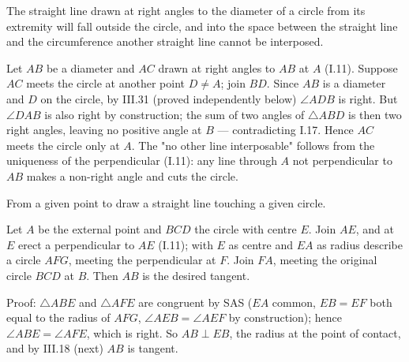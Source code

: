 \documentclass{rrxiv}
\begin{document}
\begin{claim}
\label{prop:III.16}
The straight line drawn at right angles to the diameter of a circle
from its extremity will fall outside the circle, and into the space
between the straight line and the circumference another straight
line cannot be interposed.
\end{claim}
\begin{evidence}
\label{ev:III.16}
Let $AB$ be a diameter and $AC$ drawn at right angles to $AB$ at
$A$ (I.11).  Suppose $AC$ meets the circle at another point $D
\neq A$; join $BD$.  Since $AB$ is a diameter and $D$ on the
circle, by III.31 (proved independently below) $\angle ADB$ is
right.  But $\angle DAB$ is also right by construction; the sum of
two angles of $\triangle ABD$ is then two right angles, leaving no
positive angle at $B$ --- contradicting I.17.  Hence $AC$ meets the
circle only at $A$.  The "no other line interposable" follows from
the uniqueness of the perpendicular (I.11): any line through $A$
not perpendicular to $AB$ makes a non-right angle and cuts the
circle.
\end{evidence}

\begin{claim}
\label{prop:III.17}
From a given point to draw a straight line touching a given circle.
\end{claim}
\begin{evidence}
\label{ev:III.17}
Let $A$ be the external point and $BCD$ the circle with centre $E$.
Join $AE$, and at $E$ erect a perpendicular to $AE$ (I.11); with
$E$ as centre and $EA$ as radius describe a circle $AFG$, meeting
the perpendicular at $F$.  Join $FA$, meeting the original circle
$BCD$ at $B$.  Then $AB$ is the desired tangent.

Proof: $\triangle ABE$ and $\triangle AFE$ are congruent by SAS
($EA$ common, $EB = EF$ both equal to the radius of $AFG$,
$\angle AEB = \angle AEF$ by construction); hence $\angle ABE =
\angle AFE$, which is right.  So $AB \perp EB$, the radius at the
point of contact, and by III.18 (next) $AB$ is tangent.
\end{evidence}
\end{document}
